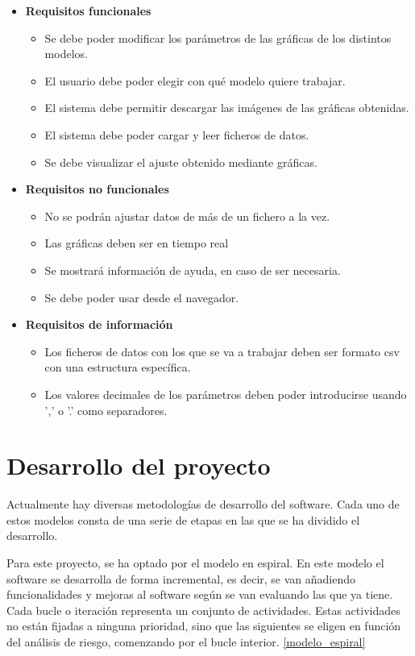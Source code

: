 \begin{itemize}
\item \textbf{Requisitos funcionales}
	\begin{itemize}
	\item Se debe poder modificar los parámetros de las gráficas de los distintos modelos.
	\item El usuario debe poder elegir con qué modelo quiere trabajar.
	\item El sistema debe permitir descargar las imágenes de las gráficas obtenidas.
	\item El sistema debe poder cargar y leer ficheros de datos.
	\item Se debe visualizar el ajuste obtenido mediante gráficas.
	\end{itemize}
\item \textbf{Requisitos no funcionales}
	\begin{itemize}
	\item No se podrán ajustar datos de más de un fichero a la vez.
	\item Las gráficas deben ser en tiempo real
	\item Se mostrará información de ayuda, en caso de ser necesaria.
	\item Se debe poder usar desde el navegador.
	\end{itemize}
\item \textbf{Requisitos de información}
	\begin{itemize}
	\item Los ficheros de datos con los que se va a trabajar deben ser formato csv con una estructura específica.
	\item Los valores decimales de los parámetros deben poder introducirse usando ',' o '.' como separadores.
	\end{itemize}
\end{itemize}

\section{Desarrollo del proyecto}

Actualmente hay diversas metodologías de desarrollo del software. Cada uno de estos modelos consta de una serie de etapas en las que se ha dividido el desarrollo.

Para este proyecto, se ha optado por el modelo en espiral. En este modelo el software se desarrolla de forma incremental, es decir, se van añadiendo funcionalidades y mejoras al software según se van evaluando las que ya tiene. Cada bucle o iteración representa un conjunto de actividades. Estas actividades no están fijadas a ninguna prioridad, sino que las siguientes se eligen en función del análisis de riesgo, comenzando por el bucle interior. \eqref{modelo_espiral}

